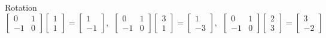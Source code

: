 \documentclass[xcolor=dvipsnames,aspectratio=169,t]{beamer}
\begin{document}
\begin{frame}{Rotation}
\[ \begin{bmatrix} 0 & 1 \\ -1 & 0 \end{bmatrix} \begin{bmatrix} 1 \\ 1 \end{bmatrix} = \begin{bmatrix} 1 \\ -1 \end{bmatrix} , \ \   \begin{bmatrix} 0 & 1 \\ -1 & 0 \end{bmatrix} \begin{bmatrix} 3 \\ 1 \end{bmatrix} =  \begin{bmatrix} 1 \\ -3 \end{bmatrix} , \ \  \begin{bmatrix} 0 & 1 \\ -1 & 0 \end{bmatrix} \begin{bmatrix} 2 \\ 3 \end{bmatrix} =  \begin{bmatrix} 3 \\ -2 \end{bmatrix} \]


\end{frame}
\end{document}
